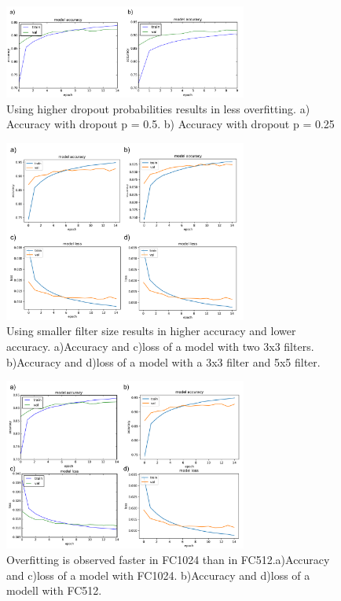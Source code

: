 \documentclass[12pt]{article}
\begin{document}
\begin{figure}[!tpb]
	\centerline{\includegraphics[width=80mm]{DropoutComparison.png}}
	\caption{\label{Figure 3}
		Using higher dropout probabilities results in less overfitting. a) Accuracy with dropout p = 0.5. b) Accuracy with dropout p = 0.25}
\end{figure}

\begin{figure}[!tpb]
	\centerline{\includegraphics[width=80mm]{filtersizecomparison.png}}
	\caption{\label{Figure 4}
		Using smaller filter size results in higher accuracy and lower accuracy. a)Accuracy and c)loss of a model with two 3x3 filters. b)Accuracy and d)loss of a model with a 3x3 filter and 5x5 filter.}
\end{figure}

\begin{figure}[!tpb]
	\centerline{\includegraphics[width=80mm]{comparefcunits.png}}
	\caption{\label{Figure 5}
		Overfitting is observed faster in FC1024 than in FC512.a)Accuracy and c)loss of a model with FC1024. b)Accuracy and d)loss of a modell with FC512.}
\end{figure}
\end{document}
